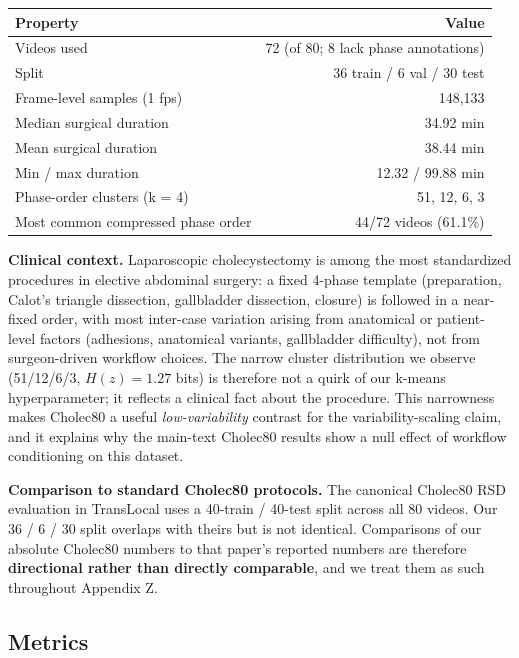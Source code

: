 \begin{longtable}[]{@{}lr@{}}
\toprule\noalign{}
Property & Value \\
\midrule\noalign{}
\endhead
\bottomrule\noalign{}
\endlastfoot
Videos used & 72 (of 80; 8 lack phase annotations) \\
Split & 36 train / 6 val / 30 test \\
Frame-level samples (1 fps) & 148,133 \\
Median surgical duration & 34.92 min \\
Mean surgical duration & 38.44 min \\
Min / max duration & 12.32 / 99.88 min \\
Phase-order clusters (k = 4) & 51, 12, 6, 3 \\
Most common compressed phase order & 44/72 videos (61.1\%) \\
\end{longtable}

\textbf{Clinical context.} Laparoscopic cholecystectomy is among the
most standardized procedures in elective abdominal surgery: a fixed
4-phase template (preparation, Calot's triangle dissection, gallbladder
dissection, closure) is followed in a near-fixed order, with most
inter-case variation arising from anatomical or patient-level factors
(adhesions, anatomical variants, gallbladder difficulty), not from
surgeon-driven workflow choices. The narrow cluster distribution we
observe (51/12/6/3, \(H(z) = 1.27\) bits) is therefore not a quirk of
our k-means hyperparameter; it reflects a clinical fact about the
procedure. This narrowness makes Cholec80 a useful
\emph{low-variability} contrast for the variability-scaling claim, and
it explains why the main-text Cholec80 results show a null effect of
workflow conditioning on this dataset.

\textbf{Comparison to standard Cholec80 protocols.} The canonical
Cholec80 RSD evaluation in TransLocal \citep{loukas2024translocal} uses a
40-train / 40-test split across all 80 videos. Our 36 / 6 / 30 split
overlaps with theirs but is not identical. Comparisons of our absolute
Cholec80 numbers to that paper's reported numbers are therefore
\textbf{directional rather than directly comparable}, and we treat them as such
throughout Appendix Z.

\subsection{Metrics}\label{metrics}

